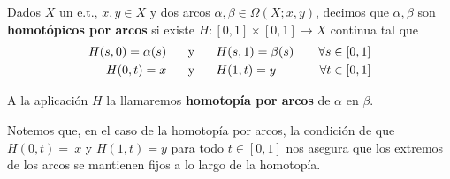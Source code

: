 \begin{definicion}
    Dados $X$ un e.t., $x,y\in X$ y dos arcos $\alpha, \beta\in \Omega(X;x,y)$, decimos que $\alpha, \beta$ son \textbf{homotópicos por arcos} si existe $H:[0,1]\times [0,1] \to X$ continua tal que 
    \begin{align*}
        H(s,0) = \alpha(s) \hspace{0.5cm} &\text{ y } \hspace{0.5cm} H(s,1) = \beta(s) \ \ \ &\forall s\in [0,1]\\
        H(0,t) = x  \hspace{0.5cm} &\text{ y } \hspace{0.5cm} H(1,t) = y \ \ \ &\forall t \in [0,1]
    \end{align*}

    A la aplicación $H$ la llamaremos \textbf{homotopía por arcos} de $\alpha$ en $\beta$.
\end{definicion}

Notemos que, en el caso de la homotopía por arcos, la condición de que $H(0,t) =~x$ y $H(1,t) = y$ para todo $t\in [0,1]$ nos asegura que los extremos de los arcos se mantienen fijos a lo largo de la homotopía.

